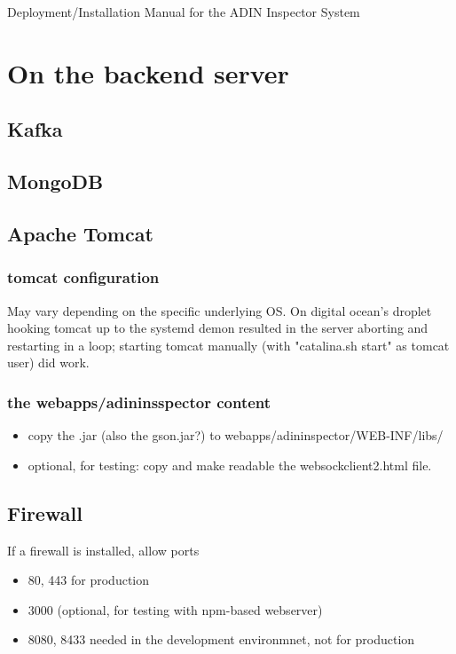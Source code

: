\documentclass[oneside, english, final]{design}
\begin{document}
{\large Deployment/Installation Manual for the ADIN Inspector System}

\section{On the backend server}
\subsection{Kafka}
\subsection{MongoDB}

\subsection{Apache Tomcat}
\subsubsection{tomcat configuration}
May vary depending on the specific underlying OS.
On digital ocean's droplet hooking tomcat up to the systemd demon resulted in the server aborting and restarting in a loop; starting tomcat manually (with "catalina.sh start" as tomcat user) did work.

\subsubsection{the webapps/adininsspector content}
\begin{itemize}
\item{copy the .jar (also the gson.jar?) to webapps/adininspector/WEB-INF/libs/}
\item{optional, for testing: copy and make readable the websockclient2.html file.}
\end{itemize}

\subsection{Firewall}
If a firewall is installed, allow ports
\begin{itemize}
\item{80, 443 for production} 
\item{3000 (optional, for testing with npm-based webserver)}
\item{8080, 8433 needed in the development environmnet, not for production}
\end{itemize}
\end{document}
